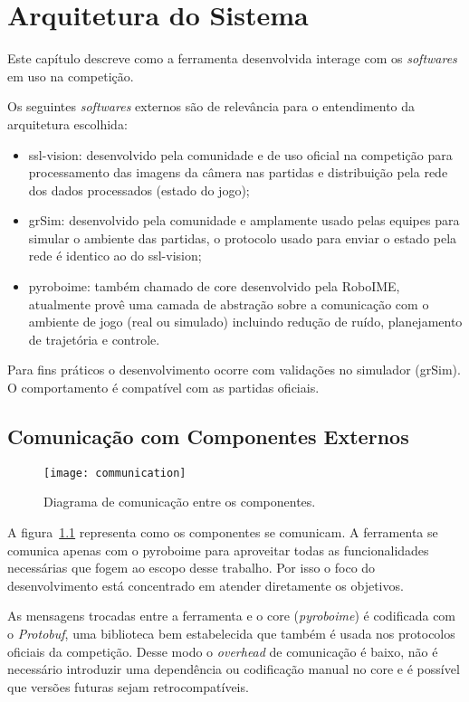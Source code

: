 \chapter{Arquitetura do Sistema}\label{cap:arquitetura}

Este capítulo descreve como a ferramenta desenvolvida interage com os
\textit{softwares} em uso na competição.

Os seguintes \textit{softwares} externos são de relevância para o entendimento
da arquitetura escolhida:

\begin{itemize}
  \item ssl-vision: desenvolvido pela comunidade e de uso oficial na competição
    para processamento das imagens da câmera nas partidas e distribuição pela
    rede dos dados processados (estado do jogo);
  \item grSim: desenvolvido pela comunidade e amplamente usado pelas equipes
    para simular o ambiente das partidas, o protocolo usado para enviar o estado
    pela rede é identico ao do ssl-vision;
  \item pyroboime: também chamado de core desenvolvido pela RoboIME, atualmente
    provê uma camada de abstração sobre a comunicação com o ambiente de jogo
    (real ou simulado) incluindo redução de ruído, planejamento de trajetória e
    controle.
\end{itemize}

Para fins práticos o desenvolvimento ocorre com validações no simulador (grSim).
O comportamento é compatível com as partidas oficiais.

\section{Comunicação com Componentes Externos}

\begin{figure}[H]
  \centering
  \texttt{[image: communication]}
  \caption{Diagrama de comunicação entre os componentes.}\label{fig:arch-comm}
\end{figure}

A figura~\ref{fig:arch-comm} representa como os componentes se comunicam.  A
ferramenta se comunica apenas com o pyroboime para aproveitar todas as
funcionalidades necessárias que fogem ao escopo desse trabalho.  Por isso o foco
do desenvolvimento está concentrado em atender diretamente os objetivos.

As mensagens trocadas entre a ferramenta e o core (\textit{pyroboime}) é
codificada com o \textit{Protobuf}, uma biblioteca bem estabelecida que também é
usada nos protocolos oficiais da competição.  Desse modo o \textit{overhead} de
comunicação é baixo, não é necessário introduzir uma dependência ou codificação
manual no core e é possível que versões futuras sejam retrocompatíveis.

